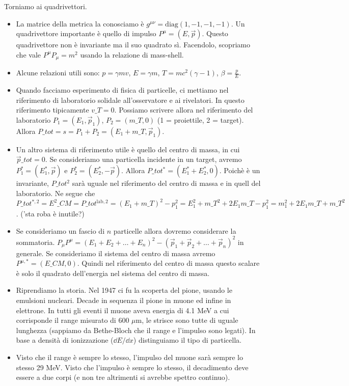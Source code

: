     Torniamo ai quadrivettori. 
    \begin{itemize}
    \item La matrice della metrica la conosciamo è $g^{\mu\nu}=\text{diag}(1,-1,-1,-1)$. Un quadrivettore importante è quello di impulso $P^\mu=(E,\vec p)$. Questo quadrivettore non è invariante ma il suo quadrato sì. Facendolo, scopriamo che vale $P^\mu P_\mu=m^2$ usando la relazione di mass-shell.
    \item Alcune relazioni utili sono: $p=\gamma mv$, $E=\gamma m$, $T=mc^2(\gamma-1)$, $\beta=\frac p E$.
    \item Quando facciamo esperimento di fisica di particelle, ci mettiamo nel riferimento di laboratorio solidale all'osservatore e ai rivelatori. In questo riferimento tipicamente $v\_T=0$. Possiamo scrivere allora nel riferimento del laboratorio $P_1=(E_1,\vec {p}_1)$, $P_2 = (m\_T,0)$ (1 = proiettile, 2 = target). Allora $P\_{tot}=s=P_1+P_2=(E_1+m\_T,\vec p_1)$. 
    \item Un altro sistema di riferimento utile è quello del centro di massa, in cui $\vec {p}\_{tot}=0$. Se consideriamo una particella incidente in un target, avremo $P_1^*=(E_1^*,\vec p)$ e $P_2^*=(E_2^*,-\vec p)$. Allora $P\_{tot}^*=(E_1^*+E_2^*,0)$. Poichè è un invariante, $P\_{tot}^2$ sarà uguale nel riferimento del centro di massa e in quell del laboratorio. Ne segue che $P\_{tot}^{*,2}=E^2\_{CM}=P\_{tot}^{\text{lab},2}=(E_1+m\_T)^2-p_1^2=E_1^2+m\_T^2+2E_1m\_T-p_1^2=m_1^2+2E_1m\_T+m\_T^2$. ('sta roba è inutile?)
    \item Se consideriamo un fascio di $n$ particelle allora dovremo considerare la sommatoria. $P_\mu P^\mu= (E_1+E_2+\dots+E_n)^2-(\vec p_1+\vec p_2+\dots+\vec p_n)^2$ in generale. Se consideriamo il sistema del centro di massa avremo $P^{\mu,*}=(E\_{CM},0)$. Quindi nel riferimento del centro di massa questo scalare è solo il quadrato dell'energia nel sistema del centro di massa.
    \item Riprendiamo la storia. Nel 1947 ci fu la scoperta del pione, usando le emulsioni nucleari. Decade in sequenza il pione in muone ed infine in elettrone. In tutti gli eventi il muone aveva energia di 4.1 MeV a cui corrisponde il range misurato di 600 $\mu$m, le strisce sono tutte di uguale lunghezza (sappiamo da Bethe-Bloch che il range e l'impulso sono legati). In base a densità di ionizzazione ($\dd{E}/\dd{x}$) distinguiamo il tipo di particella.
    \item Visto che il range è sempre lo stesso, l'impulso del muone sarà sempre lo stesso 29 MeV. Visto che l'impulso è sempre lo stesso, il decadimento deve essere a due corpi (e non tre altrimenti si avrebbe spettro continuo). 

\end{itemize}
